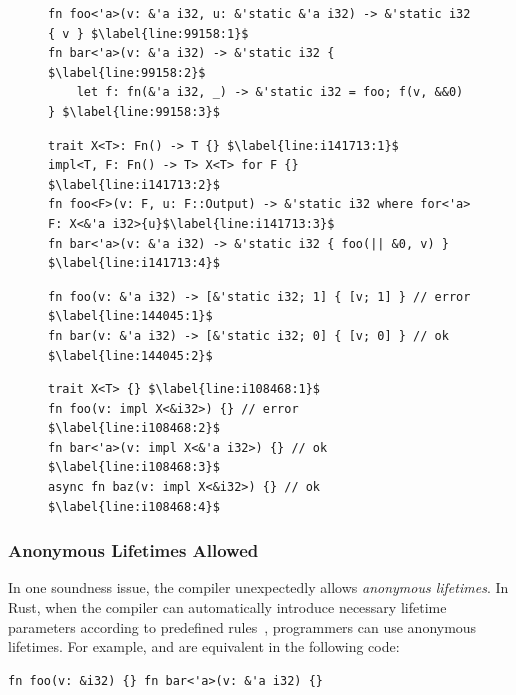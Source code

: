 \begin{figure}[t]
\begin{lstlisting}[caption={Issue 99158}, label={lst:i99158}]
fn foo<'a>(v: &'a i32, u: &'static &'a i32) -> &'static i32 { v } $\label{line:99158:1}$
fn bar<'a>(v: &'a i32) -> &'static i32 { $\label{line:99158:2}$
    let f: fn(&'a i32, _) -> &'static i32 = foo; f(v, &&0) } $\label{line:99158:3}$
\end{lstlisting}
\vspace{-1.2em}
\begin{lstlisting}[caption={Issue 141713}, label={lst:i141713}]
trait X<T>: Fn() -> T {} $\label{line:i141713:1}$
impl<T, F: Fn() -> T> X<T> for F {} $\label{line:i141713:2}$
fn foo<F>(v: F, u: F::Output) -> &'static i32 where for<'a> F: X<&'a i32>{u}$\label{line:i141713:3}$
fn bar<'a>(v: &'a i32) -> &'static i32 { foo(|| &0, v) } $\label{line:i141713:4}$
\end{lstlisting}
\vspace{-1.2em}
\begin{lstlisting}[caption={Issue 144045}, label={lst:i144045}]
fn foo(v: &'a i32) -> [&'static i32; 1] { [v; 1] } // error $\label{line:144045:1}$
fn bar(v: &'a i32) -> [&'static i32; 0] { [v; 0] } // ok $\label{line:144045:2}$
\end{lstlisting}
\vspace{-1.2em}
\begin{lstlisting}[caption={Issue 108468}, label={lst:i108468}]
trait X<T> {} $\label{line:i108468:1}$
fn foo(v: impl X<&i32>) {} // error $\label{line:i108468:2}$
fn bar<'a>(v: impl X<&'a i32>) {} // ok $\label{line:i108468:3}$
async fn baz(v: impl X<&i32>) {} // ok $\label{line:i108468:4}$
\end{lstlisting}
\vspace{-1.2em}
\end{figure}

\subsubsection{Anonymous Lifetimes Allowed}

In one soundness issue, the compiler unexpectedly allows \emph{anonymous
lifetimes}.
%
In Rust, when the compiler can automatically introduce necessary lifetime
parameters according to predefined rules~\cite{rust-lifetime-elision},
programmers can use anonymous lifetimes.
%
For example,  and  are equivalent in the following code:

\vspace{-0.5em}
\begin{lstlisting}
fn foo(v: &i32) {} fn bar<'a>(v: &'a i32) {}
\end{lstlisting}
\vspace{-0.5em}

